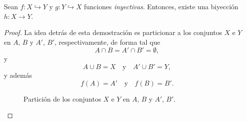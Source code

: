 \begin{theorem}
    Sean $f: X \hookrightarrow Y$ y $g: Y \hookrightarrow X$ funciones \textit{inyectivas}. Entonces, existe una biyección $h: X \to  Y$.
\end{theorem}

\begin{proof}
    La idea detrás de esta demostración es particionar a los conjuntos $X$ e $Y$ en $A$, $B$ y $A'$, $B'$, respectivamente, de forma tal que 
        $$
            A \cap B = A' \cap B' = \emptyset,
        $$
        y
        $$
            A \cup B = X \quad \text{y} \quad A' \cup B' = Y,
        $$
        y además
        $$
            f(A) = A' \quad \text{y} \quad f(B) = B'.
        $$
    \begin{figure}[H]
        \centering
        \caption{Partición de los conjuntos $X$ e $Y$ en $A$, $B$ y $A'$, $B'$.}
    \end{figure}


\end{proof}
